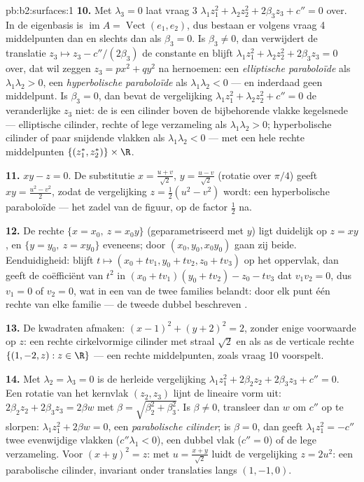 \begin{solution}{pb:b2:surfaces:1}
\textbf{10.} Met $\lambda_3 = 0$ laat vraag 3 $\lambda_1z_1^2 +
\lambda_2z_2^2 + 2\beta_3z_3 + c'' = 0$ over. In de eigenbasis is
$\operatorname{im}A = \operatorname{Vect}(e_1, e_2)$, dus bestaan
er volgens vraag 4 middelpunten dan en slechts dan als $\beta_3 =
0$. Is $\beta_3 \neq 0$, dan verwijdert de translatie $z_3 \mapsto
z_3 - c''/(2\beta_3)$ de constante en blijft $\lambda_1z_1^2 +
\lambda_2z_2^2 + 2\beta_3z_3 = 0$ over, dat wil zeggen $z_3 = px^2
+ qy^2$ na hernoemen: een \emph{elliptische paraboloïde} als
$\lambda_1\lambda_2 > 0$, een \emph{hyperbolische paraboloïde} als
$\lambda_1\lambda_2 < 0$ --- en inderdaad geen middelpunt. Is
$\beta_3 = 0$, dan bevat de vergelijking $\lambda_1z_1^2 +
\lambda_2z_2^2 + c'' = 0$ de veranderlijke $z_3$ niet: de 
is een cilinder boven de bijbehorende vlakke kegelsnede ---
elliptische cilinder, rechte of lege verzameling als
$\lambda_1\lambda_2 > 0$; hyperbolische cilinder of paar snijdende
vlakken als $\lambda_1\lambda_2 < 0$ --- met een hele rechte
middelpunten $\{(z_1^*, z_2^*)\} \times \R$.

\textbf{11.} $xy - z = 0$. De substitutie $x = \frac{u +
v}{\sqrt2}$, $y = \frac{u - v}{\sqrt2}$ (rotatie over $\pi/4$)
geeft $xy = \frac{u^2 - v^2}2$, zodat de vergelijking $z =
\frac12(u^2 - v^2)$ wordt: een hyperbolische paraboloïde --- het
zadel van de figuur, op de factor $\frac12$ na.

\textbf{12.} De rechte $\{x = x_0,\ z = x_0y\}$ (geparametriseerd
met $y$) ligt duidelijk op $z = xy$, en $\{y = y_0,\ z = xy_0\}$
eveneens; door $(x_0, y_0, x_0y_0)$ gaan zij beide. Eenduidigheid:
blijft $t \mapsto (x_0 + tv_1, y_0 + tv_2, z_0 + tv_3)$ op het
oppervlak, dan geeft de coëfficiënt van $t^2$ in $(x_0 +
tv_1)(y_0 + tv_2) - z_0 - tv_3$ dat $v_1v_2 = 0$, dus $v_1 = 0$ of
$v_2 = 0$, wat in een van de twee families belandt: door elk punt
één rechte van elke familie --- de tweede dubbel beschreven
.

\textbf{13.} De kwadraten afmaken: $(x - 1)^2 + (y + 2)^2 = 2$,
zonder enige voorwaarde op $z$: een rechte cirkelvormige cilinder
met straal $\sqrt2$ en als as de verticale rechte $\{(1, -2, z) : z
\in \R\}$ --- een rechte middelpunten, zoals vraag 10 voorspelt.

\textbf{14.} Met $\lambda_2 = \lambda_3 = 0$ is de herleide
vergelijking $\lambda_1z_1^2 + 2\beta_2z_2 + 2\beta_3z_3 + c'' =
0$. Een rotatie van het kernvlak $(z_2, z_3)$ lijnt de lineaire vorm
uit: $2\beta_2z_2 + 2\beta_3z_3 = 2\beta w$ met $\beta =
\sqrt{\beta_2^2 + \beta_3^2}$. Is $\beta \neq 0$, transleer dan $w$
om $c''$ op te slorpen: $\lambda_1z_1^2 + 2\beta w = 0$, een
\emph{parabolische cilinder}; is $\beta = 0$, dan geeft
$\lambda_1z_1^2 = -c''$ twee evenwijdige vlakken ($c'' \lambda_1 <
0$), een dubbel vlak ($c'' = 0$) of de lege verzameling. Voor $(x +
y)^2 = z$: met $u = \frac{x + y}{\sqrt2}$ luidt de vergelijking $z
= 2u^2$: een parabolische cilinder, invariant onder translaties
langs $(1, -1, 0)$.


\end{solution}
